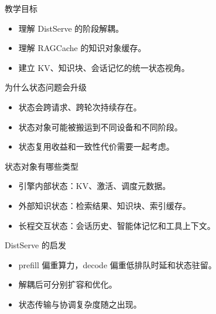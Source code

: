 




\begin{frame}[plain]
  \titlepage
\end{frame}

\begin{frame}{教学目标}
  \begin{itemize}
    \item 理解 DistServe 的阶段解耦。
    \item 理解 RAGCache 的知识对象缓存。
    \item 建立 KV、知识块、会话记忆的统一状态视角。
  \end{itemize}
\end{frame}

\begin{frame}{为什么状态问题会升级}
  \begin{itemize}
    \item 状态会跨请求、跨轮次持续存在。
    \item 状态对象可能被搬运到不同设备和不同阶段。
    \item 状态复用收益和一致性代价需要一起考虑。
  \end{itemize}
\end{frame}

\begin{frame}{状态对象有哪些类型}
  \begin{itemize}
    \item 引擎内部状态：KV、激活、调度元数据。
    \item 外部知识状态：检索结果、知识块、索引缓存。
    \item 长程交互状态：会话历史、智能体记忆和工具上下文。
  \end{itemize}
\end{frame}

\begin{frame}{DistServe 的启发}
  \begin{itemize}
    \item prefill 偏重算力，decode 偏重低排队时延和状态驻留。
    \item 解耦后可分别扩容和优化。
    \item 状态传输与协调复杂度随之出现。
  \end{itemize}
\end{frame}

